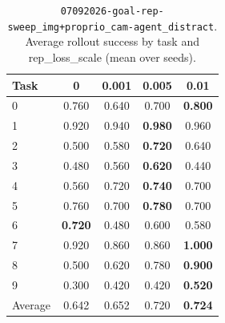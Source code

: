\begin{table}
\caption{\texttt{07092026-goal-rep-sweep\_img+proprio\_cam-agent\_distract}. Average rollout success by task and rep\_loss\_scale (mean over seeds).}
\label{tab:07092026_goal_rep_sweep_img_proprio_cam_agent_distract_rep_loss_success}
\begin{tabular}{lcccc}
\toprule
Task & 0 & 0.001 & 0.005 & 0.01 \\
\midrule
0 & 0.760 & 0.640 & 0.700 & \textbf{0.800} \\
1 & 0.920 & 0.940 & \textbf{0.980} & 0.960 \\
2 & 0.500 & 0.580 & \textbf{0.720} & 0.640 \\
3 & 0.480 & 0.560 & \textbf{0.620} & 0.440 \\
4 & 0.560 & 0.720 & \textbf{0.740} & 0.700 \\
5 & 0.760 & 0.700 & \textbf{0.780} & 0.700 \\
6 & \textbf{0.720} & 0.480 & 0.600 & 0.580 \\
7 & 0.920 & 0.860 & 0.860 & \textbf{1.000} \\
8 & 0.500 & 0.620 & 0.780 & \textbf{0.900} \\
9 & 0.300 & 0.420 & 0.420 & \textbf{0.520} \\
\midrule
Average & 0.642 & 0.652 & 0.720 & \textbf{0.724} \\
\bottomrule
\end{tabular}
\end{table}



